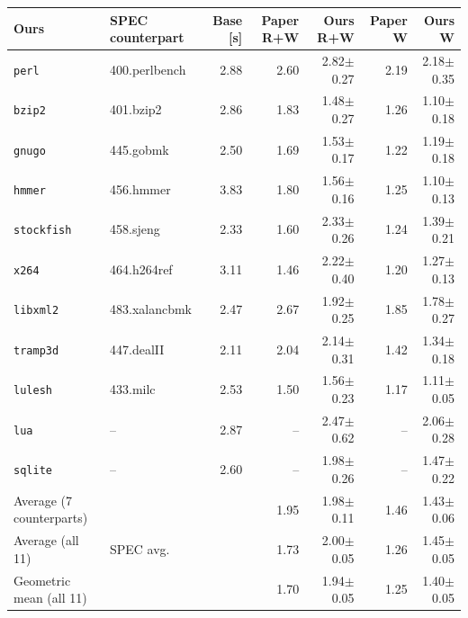 \begin{tabular}{llrrrrr}
\toprule
Ours & SPEC counterpart & Base [s] & Paper R+W & Ours R+W & Paper W & Ours W \\
\midrule
\texttt{perl} & 400.perlbench & 2.88 & 2.60 & 2.82$\pm$0.27 & 2.19 & 2.18$\pm$0.35 \\
\texttt{bzip2} & 401.bzip2 & 2.86 & 1.83 & 1.48$\pm$0.27 & 1.26 & 1.10$\pm$0.18 \\
\texttt{gnugo} & 445.gobmk & 2.50 & 1.69 & 1.53$\pm$0.17 & 1.22 & 1.19$\pm$0.18 \\
\texttt{hmmer} & 456.hmmer & 3.83 & 1.80 & 1.56$\pm$0.16 & 1.25 & 1.10$\pm$0.13 \\
\texttt{stockfish} & 458.sjeng & 2.33 & 1.60 & 2.33$\pm$0.26 & 1.24 & 1.39$\pm$0.21 \\
\texttt{x264} & 464.h264ref & 3.11 & 1.46 & 2.22$\pm$0.40 & 1.20 & 1.27$\pm$0.13 \\
\texttt{libxml2} & 483.xalancbmk & 2.47 & 2.67 & 1.92$\pm$0.25 & 1.85 & 1.78$\pm$0.27 \\
\texttt{tramp3d} & 447.dealII & 2.11 & 2.04 & 2.14$\pm$0.31 & 1.42 & 1.34$\pm$0.18 \\
\texttt{lulesh} & 433.milc & 2.53 & 1.50 & 1.56$\pm$0.23 & 1.17 & 1.11$\pm$0.05 \\
\texttt{lua} & -- & 2.87 & -- & 2.47$\pm$0.62 & -- & 2.06$\pm$0.28 \\
\texttt{sqlite} & -- & 2.60 & -- & 1.98$\pm$0.26 & -- & 1.47$\pm$0.22 \\
\midrule
Average (7 counterparts) &  &  & 1.95 & 1.98$\pm$0.11 & 1.46 & 1.43$\pm$0.06 \\
Average (all 11) & SPEC avg. &  & 1.73 & 2.00$\pm$0.05 & 1.26 & 1.45$\pm$0.05 \\
Geometric mean (all 11) &  &  & 1.70 & 1.94$\pm$0.05 & 1.25 & 1.40$\pm$0.05 \\
\bottomrule
\end{tabular}

